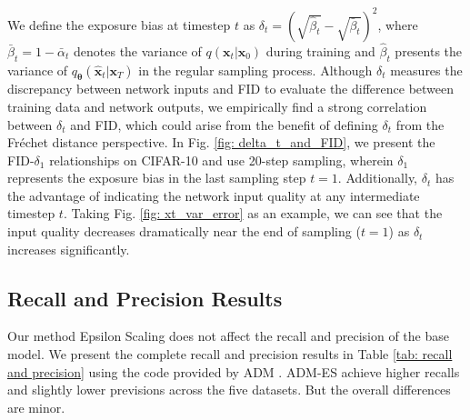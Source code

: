 \documentclass{article} \usepackage{iclr2024_conference,times}
\begin{document}
We define the exposure bias at timestep $t$ as 
$\delta_t = (\sqrt{\hat{\beta}_t} - \sqrt{\bar{\beta}_t})^2 $, where $\bar{\beta}_t = 1-\bar{\alpha}_t$ denotes the variance of $q(\pmb{x}_{t} | \pmb{x}_0)$ during training and $\hat{\beta}_t$ presents the variance of $q_{\pmb{\theta}}(\hat{\pmb{x}}_{t} | \pmb{x}_{T})$ in the regular sampling process. Although $\delta_t$ measures the discrepancy between network inputs and FID to evaluate the difference between training data and network outputs, we empirically find a strong correlation between $\delta_t$ and FID, which could arise from the benefit of defining $\delta_t$ from 
 the Fréchet distance \citet{dowson1982frechet} perspective. In Fig. \ref{fig: delta_t_and_FID}, we present the FID-$\delta_1$ relationships on CIFAR-10 and use 20-step sampling, wherein $\delta_1$ represents the exposure bias in the last sampling step $t=1$. Additionally, $\delta_t$ has the advantage of indicating the network input quality at any intermediate timestep $t$. Taking Fig. \ref{fig: xt_var_error} as an example, we can see that the input quality decreases dramatically near the end of sampling ($t=1$) as $\delta_t$ increases significantly.


\subsection{Recall and Precision Results}
\label{Append: recall and precision}
Our method Epsilon Scaling does not affect the recall and precision of the base model. We present the complete recall and precision \citep{kynkaanniemi2019improved} results in Table \ref{tab: recall and precision} using the code provided by ADM \citep{ADM}. ADM-ES achieve higher recalls and slightly lower previsions across the five datasets. But the overall differences are minor. 
\end{document}
